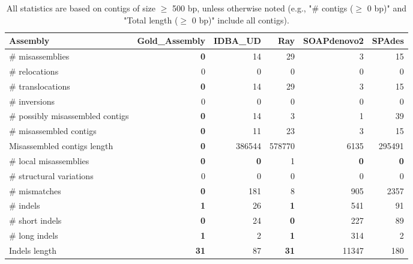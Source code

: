 \documentclass[12pt,a4paper]{article}
\begin{document}
\begin{table}[ht]
\begin{center}
\caption{All statistics are based on contigs of size $\geq$ 500 bp, unless otherwise noted (e.g., "\# contigs ($\geq$ 0 bp)" and "Total length ($\geq$ 0 bp)" include all contigs).}
\begin{tabular}{|l*{5}{|r}|}
\hline
Assembly & Gold\_Assembly & IDBA\_UD & Ray & SOAPdenovo2 & SPAdes \\ \hline
\# misassemblies & {\bf 0} & 14 & 29 & 3 & 15 \\ \hline
\hspace{5mm}\# relocations & 0 & 0 & 0 & 0 & 0 \\ \hline
\hspace{5mm}\# translocations & {\bf 0} & 14 & 29 & 3 & 15 \\ \hline
\hspace{5mm}\# inversions & 0 & 0 & 0 & 0 & 0 \\ \hline
\# possibly misassembled contigs & {\bf 0} & 14 & 3 & 1 & 39 \\ \hline
\# misassembled contigs & {\bf 0} & 11 & 23 & 3 & 15 \\ \hline
Misassembled contigs length & {\bf 0} & 386544 & 578770 & 6135 & 295491 \\ \hline
\# local misassemblies & {\bf 0} & {\bf 0} & 1 & {\bf 0} & {\bf 0} \\ \hline
\# structural variations & 0 & 0 & 0 & 0 & 0 \\ \hline
\# mismatches & {\bf 0} & 181 & 8 & 905 & 2357 \\ \hline
\# indels & {\bf 1} & 26 & {\bf 1} & 541 & 91 \\ \hline
\hspace{5mm}\# short indels & {\bf 0} & 24 & {\bf 0} & 227 & 89 \\ \hline
\hspace{5mm}\# long indels & {\bf 1} & 2 & {\bf 1} & 314 & 2 \\ \hline
Indels length & {\bf 31} & 87 & {\bf 31} & 11347 & 180 \\ \hline
\end{tabular}
\end{center}
\end{table}
\end{document}

